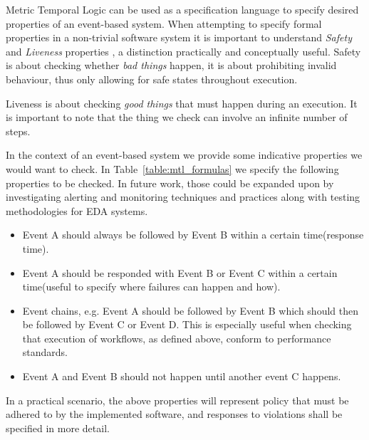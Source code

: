 \documentclass[twocolumn]{article}
\begin{document}
Metric Temporal Logic can be used as a specification language to specify desired properties of an event-based system.
When attempting to specify formal properties in a non-trivial software system it is important to understand {\it Safety} and {\it Liveness} properties \cite{lamport_what_1983} , a distinction practically and conceptually useful.
Safety is about checking whether {\it bad things} happen, it is about prohibiting invalid behaviour, thus only allowing for safe states throughout execution.

Liveness is about checking {\it good things} that must happen during an execution. It is important to note that the thing we check can involve an infinite number of steps.



In the context of an event-based system we provide some indicative properties we would want to check. In Table~\ref{table:mtl_formulas} we specify the following properties to be checked. In future work, those could be expanded upon by investigating alerting and monitoring techniques and practices along with testing methodologies for EDA systems.
\begin{itemize}
	\item Event A should always be followed by Event B within a certain time(response time).
	\item Event A should be responded with Event B or Event C within a certain time(useful to specify where failures can happen and how).
	\item Event chains, e.g. Event A should be followed by Event B which should then be followed by Event C or Event D. This is especially useful when checking that execution of workflows, as defined above, conform to performance standards.
	\item Event A and Event B should not happen until another event C happens.
\end{itemize}
In a practical scenario, the above properties will represent policy that must be adhered to by the implemented software, and responses to violations shall be specified in more detail.
\end{document}
